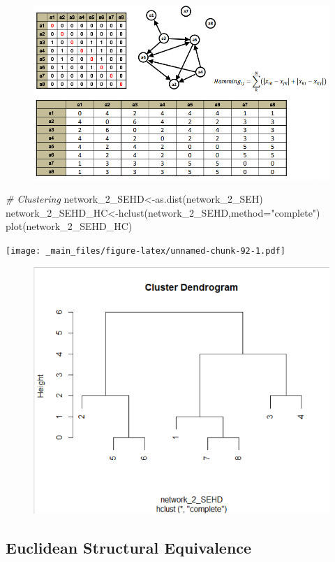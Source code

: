 \documentclass[
  notitlepage,
  onecolumn,
  openany]{book}
\newenvironment{Shaded}{\begin{snugshade}}{\end{snugshade}}
\newcommand{\AttributeTok}[1]{\textcolor[rgb]{0.77,0.63,0.00}{#1}}
\newcommand{\CommentTok}[1]{\textcolor[rgb]{0.56,0.35,0.01}{\textit{#1}}}
\newcommand{\FunctionTok}[1]{\textcolor[rgb]{0.00,0.00,0.00}{#1}}
\newcommand{\NormalTok}[1]{#1}
\newcommand{\OtherTok}[1]{\textcolor[rgb]{0.56,0.35,0.01}{#1}}
\newcommand{\StringTok}[1]{\textcolor[rgb]{0.31,0.60,0.02}{#1}}
\begin{document}
\begin{figure}[h!]

{\centering \includegraphics[width=0.5\linewidth]{images/11-Subgroups and Structural Equivalence/Untitled 7} 

}

\end{figure}

\begin{Shaded}
\begin{Highlighting}[]
\CommentTok{\# Clustering}
\NormalTok{network\_2\_SEHD}\OtherTok{\textless{}{-}}\FunctionTok{as.dist}\NormalTok{(network\_2\_SEH)}
\NormalTok{network\_2\_SEHD\_HC}\OtherTok{\textless{}{-}}\FunctionTok{hclust}\NormalTok{(network\_2\_SEHD,}\AttributeTok{method=}\StringTok{"complete"}\NormalTok{)}
\FunctionTok{plot}\NormalTok{(network\_2\_SEHD\_HC)}
\end{Highlighting}
\end{Shaded}

\texttt{[image: \_main\_files/figure-latex/unnamed-chunk-92-1.pdf]}

\begin{figure}[h!]

{\centering \includegraphics[width=0.5\linewidth]{images/11-Subgroups and Structural Equivalence/Untitled 8} 

}

\end{figure}

\hypertarget{euclidean-structural-equivalence}{%
\subsection{Euclidean Structural Equivalence}\label{euclidean-structural-equivalence}}
\end{document}
